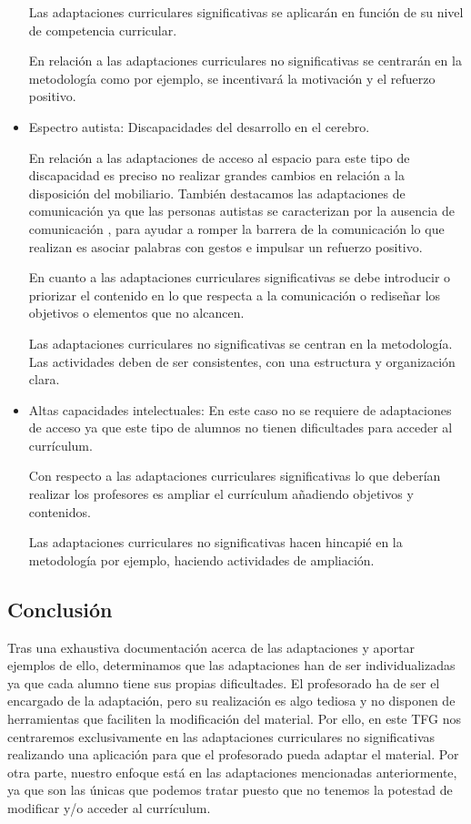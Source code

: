 \begin{itemize}
    Las adaptaciones curriculares significativas se aplicarán en función de su nivel de competencia curricular. 

    En relación a las adaptaciones curriculares no significativas se centrarán en la metodología como por ejemplo, se incentivará la motivación y el refuerzo positivo.
    
    \item Espectro autista: Discapacidades del desarrollo en el cerebro. 
    
    En relación a las adaptaciones de acceso al espacio para este tipo de discapacidad es preciso no realizar grandes cambios en relación a la disposición del mobiliario. También destacamos las adaptaciones de comunicación ya que las personas autistas se caracterizan por la ausencia de comunicación , para ayudar a romper la barrera de la comunicación lo que realizan es asociar palabras con gestos e impulsar un refuerzo positivo.

    En cuanto a las adaptaciones curriculares significativas se debe introducir o priorizar el contenido en lo que respecta a la  comunicación o rediseñar los objetivos o elementos que no alcancen.

   Las adaptaciones curriculares no significativas se centran en la metodología. Las actividades deben de ser consistentes, con una estructura y organización clara.

    \item Altas capacidades intelectuales: En este caso no se requiere de adaptaciones de acceso ya que  este tipo de alumnos no tienen dificultades para acceder al currículum. 
    
    Con respecto a las adaptaciones curriculares significativas lo que deberían realizar los profesores es ampliar el currículum añadiendo objetivos y contenidos.

   Las adaptaciones curriculares no significativas hacen hincapié en la metodología por ejemplo, haciendo actividades de ampliación.

\end{itemize}
\nocite{adaptacionUNED}

\subsection{Conclusión}
Tras una exhaustiva documentación acerca de las adaptaciones y aportar ejemplos de ello, determinamos que las adaptaciones han de ser individualizadas ya que cada alumno tiene sus propias dificultades. El profesorado ha de ser el encargado de la adaptación, pero su realización es algo tediosa y no disponen de herramientas que faciliten la modificación del material. Por ello, en este TFG nos centraremos exclusivamente en las adaptaciones curriculares no significativas realizando una aplicación para que el profesorado pueda adaptar el material. Por otra parte, nuestro enfoque está en las adaptaciones mencionadas anteriormente, ya que son las únicas que podemos tratar puesto que no tenemos la potestad de modificar y/o acceder al currículum. 


